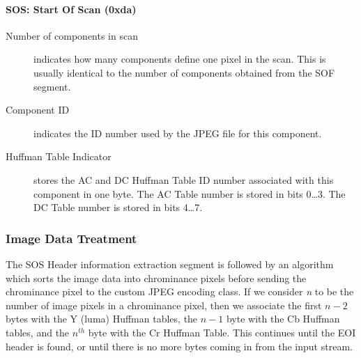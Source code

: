 \paragraph*{SOS: Start Of Scan (0xda)}
\begin{description}
	\item[Number of components in scan] indicates how many components define one pixel in the scan. 
		This is usually identical to  the number of components obtained from the SOF segment.
	\item[Component ID] indicates the ID number used by the JPEG file for this component.\footnotemark[1] 
	\item[Huffman Table Indicator] stores the AC and DC Huffman Table ID number associated with this component in one byte. 
		The AC Table number is stored in bits 0\ldots3. The DC Table number is stored in bits 4\ldots7.\footnotemark[1]
\end{description}

\subsubsection{Image Data Treatment}

The SOS Header information extraction segment is followed by 
an algorithm which sorts the image data into chrominance pixels before 
sending the chrominance pixel to the custom JPEG encoding class. 
If we consider \emph{n} to be the number of image pixels in a chrominance pixel, then 
we associate the first $n - 2$ bytes with the Y (luma) Huffman tables, the $n - 1$ byte with the Cb Huffman tables, and 
the $n^{th}$ byte with the Cr Huffman Table. 
This continues until the EOI header is found, or until there is no more bytes coming in from the input stream.
